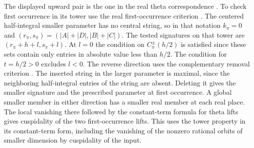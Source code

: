 The displayed upward pair is the one in the real theta correspondence \cite[Theorem~2.7(b)]{p2paul-real-theta}. To check
first occurrence in its tower use the real first-occurrence criterion \cite[Theorem~6.1]{p2ichino-real-theta}. The centered half-integral smaller parameter has
no central string, so in that notation \(k_\pi=0\) and
\((r_\pi,s_\pi)=(|A|+|D|,|B|+|C|)\). The tested signatures on
that tower are \((r_\pi+h+l,s_\pi+l)\). At \(l=0\)
the condition on \(C^\pm_\pi(h/2)\) is satisfied since these sets
contain only entries in absolute value less than \(h/2\).
The condition for \(t=h/2>0\) excludes \(l<0\).
The reverse direction uses the complementary removal criterion \cite[Proposition~3.4(ii)]{p2paul-real-theta}.
The inserted string in the larger parameter is maximal, since
the neighboring half-integral entries of the string are absent.
Deleting it gives the smaller signature and the prescribed
parameter at first occurrence. A global smaller member in either
direction has a smaller real member at each real place. The local
vanishing there followed by the constant-term formula for theta
lifts gives cuspidality of the two first-occurrence lifts. This
uses the tower property in its constant-term form, including the
vanishing of the nonzero rational orbits of smaller dimension by
cuspidality of the input.

